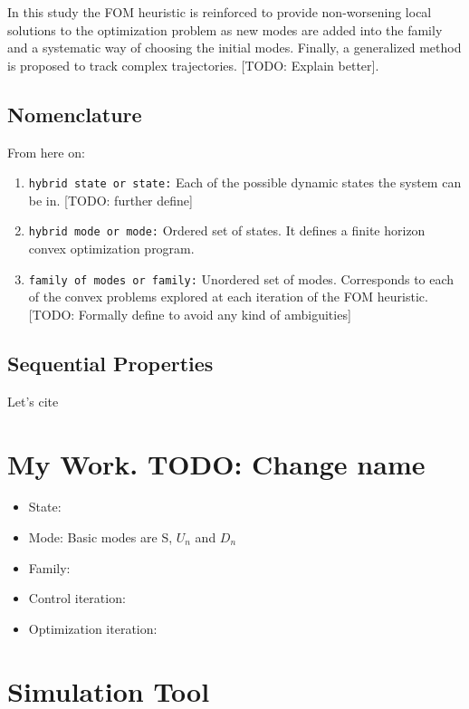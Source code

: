 \documentclass[12,twoside]{TFG-GM}
\theoremstyle{definition}
\theoremstyle{remark}
\begin{document}
In this study the FOM heuristic is reinforced to provide non-worsening local solutions to the optimization problem as new modes are added into the family and a systematic way of choosing the initial modes. Finally, a generalized method is proposed to track complex trajectories. [TODO: Explain better].



\subsection{Nomenclature}
\label{subsec:nomenclature}
From here on:
\begin{enumerate}[\bf (1)]
\item{\tt hybrid state or state:} Each of the possible dynamic states the system can be in. [TODO: further define]
\item{\tt hybrid mode or mode:} Ordered set of states. It defines a finite horizon convex optimization program.
\item{\tt family of modes or family:} Unordered set of modes. Corresponds to each of the convex problems explored at each iteration of the FOM heuristic.
[TODO: Formally define to avoid any kind of ambiguities]
\end{enumerate}

\subsection{Sequential Properties}
\label{subsec:sequential}
Let's cite \cite{seq}


\section{My Work. TODO: Change name}
\label{sec:work}


\begin{itemize}
\item {State:}
\item {Mode:} Basic modes are S, $U_n$ and $D_n$
\item {Family:}
\item {Control iteration:}
\item {Optimization iteration:}
\end{itemize}


\section{Simulation Tool}
\label{sec:sim}
\end{document}
